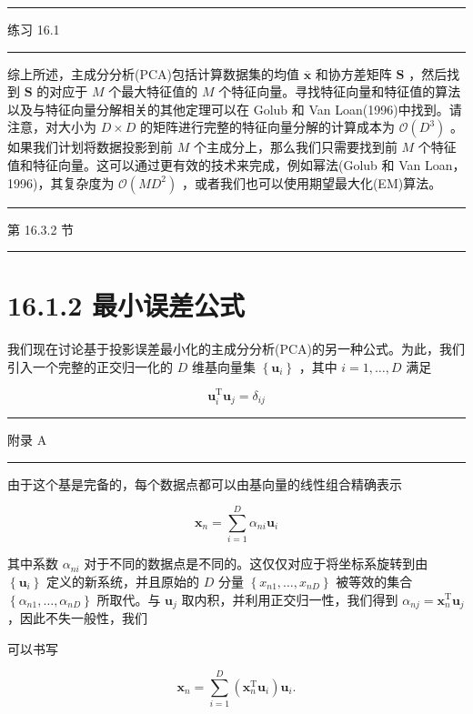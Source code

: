\documentclass[10pt]{report}
\newcommand{\HRule}{\begin{center}\rule{0.9\linewidth}{0.2mm}\end{center}}
\begin{document}
\HRule

练习 16.1

\HRule

综上所述，主成分分析(PCA)包括计算数据集的均值 \(\overline{\mathbf{x}}\) 和协方差矩阵 \(\mathbf{S}\) ，然后找到 \(\mathbf{S}\) 的对应于 \(M\) 个最大特征值的 \(M\) 个特征向量。寻找特征向量和特征值的算法以及与特征向量分解相关的其他定理可以在 Golub 和 Van Loan(1996)中找到。请注意，对大小为 \(D \times  D\) 的矩阵进行完整的特征向量分解的计算成本为 \(\mathcal{O}\left( {D}^{3}\right)\) 。如果我们计划将数据投影到前 \(M\) 个主成分上，那么我们只需要找到前 \(M\) 个特征值和特征向量。这可以通过更有效的技术来完成，例如幂法(Golub 和 Van Loan，1996)，其复杂度为 \(\mathcal{O}\left( {M{D}^{2}}\right)\) ，或者我们也可以使用期望最大化(EM)算法。

\HRule

第 16.3.2 节

\HRule

\section*{16.1.2 最小误差公式}

我们现在讨论基于投影误差最小化的主成分分析(PCA)的另一种公式。为此，我们引入一个完整的正交归一化的 \(D\) 维基向量集 \(\left\{  {\mathbf{u}}_{i}\right\}\) ，其中 \(i = 1,\ldots ,D\) 满足

\[
{\mathbf{u}}_{i}^{\mathrm{T}}{\mathbf{u}}_{j} = {\delta }_{ij} \tag{16.7}
\]

\HRule

附录 A

\HRule

由于这个基是完备的，每个数据点都可以由基向量的线性组合精确表示

\[
{\mathbf{x}}_{n} = \mathop{\sum }\limits_{{i = 1}}^{D}{\alpha }_{ni}{\mathbf{u}}_{i} \tag{16.8}
\]

其中系数 \({\alpha }_{ni}\) 对于不同的数据点是不同的。这仅仅对应于将坐标系旋转到由 \(\left\{  {\mathbf{u}}_{i}\right\}\) 定义的新系统，并且原始的 \(D\) 分量 \(\left\{  {{x}_{n1},\ldots ,{x}_{nD}}\right\}\) 被等效的集合 \(\left\{  {{\alpha }_{n1},\ldots ,{\alpha }_{nD}}\right\}\) 所取代。与 \({\mathbf{u}}_{j}\) 取内积，并利用正交归一性，我们得到 \({\alpha }_{nj} = {\mathbf{x}}_{n}^{\mathrm{T}}{\mathbf{u}}_{j}\) ，因此不失一般性，我们

可以书写

\[
{\mathbf{x}}_{n} = \mathop{\sum }\limits_{{i = 1}}^{D}\left( {{\mathbf{x}}_{n}^{\mathrm{T}}{\mathbf{u}}_{i}}\right) {\mathbf{u}}_{i}. \tag{16.9}
\]
\end{document}
